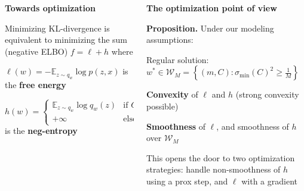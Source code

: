 \documentclass[final]{beamer}
\newcommand{\vsp}{\vspace{15pt}} %
\begin{document}
\begin{frame}{}
\begin{columns}[t]
\begin{column}{0.30\linewidth}
\begin{colorblock}[backgroundcolor=yellow_dark]
\begin{colorframe}[linecolor=red_fat, backgroundcolor=yellow_clear]
\begin{itemize}
\end{itemize}

\end{colorframe}
\end{colorblock}

\begin{colorblock}[backgroundcolor=yellow_dark]
\textbf{\large Towards optimization}
\vsp 

Minimizing KL-divergence is equivalent to minimizing the sum (negative ELBO) $f = \ell + h$ where

\vsp

$\ell(w) = -\mathbb{E}_{z\sim q_w}\log p(z,x)$ is the {\color{red_fat}\textbf{free energy}}

\vsp

$h(w) = \begin{cases}
	\mathbb{E}_{z\sim q_w}\log q_w(z) & \text{if } C \succ 0,\\
	+ \infty & \text{else},
\end{cases} $ is the {\color{red_fat}\textbf{neg-entropy}}
\end{colorblock}
		\end{column}%
		\begin{column}{0.30\linewidth}
\begin{colorblock}[backgroundcolor=orange_dark]
\textbf{\large The optimization point of view}
\vsp \vsp 


\textbf{Proposition.} 
Under our modeling assumptions:

\vsp

	Regular solution: $w^* \in \mathcal{W}_M = \left\{ (m,C) : \sigma_{\min}(C)^2 \geq \frac{1}{M} \right\}$
	
	{\color{purple_fat}\textbf{Convexity}} of $\ell$ and $h$ (strong convexity possible)
 
	{\color{purple_fat}\textbf{Smoothness}} of $\ell$, and smoothness of $h$ over $\mathcal{W}_M$

\vsp \vsp

This opens the door to two optimization strategies:
handle non-smoothness of $h$ using a prox step, and $\ell$ with a gradient 


\end{colorblock}
\end{column}
\end{columns}
\end{frame}
\end{document}
